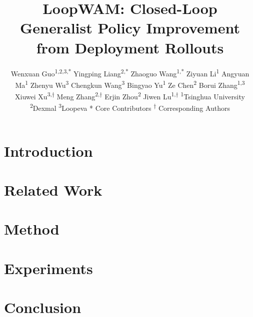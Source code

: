 \documentclass[10pt,logo]{loopwamreport}
\title{LoopWAM: Closed-Loop Generalist Policy Improvement from Deployment Rollouts}
\author{%
  Wenxuan Guo\textsuperscript{1,2,3,*}\quad\quad
  Yingping Liang\textsuperscript{2,*}\quad\quad
  Zhaoguo Wang\textsuperscript{1,*}\quad\quad
  Ziyuan Li\textsuperscript{1}\quad\quad
  Angyuan Ma\textsuperscript{1}\newline
  Zhenyu Wu\textsuperscript{3}\quad\quad
  Chengkun Wang\textsuperscript{3}\quad\quad
  Bingyao Yu\textsuperscript{1}\quad\quad
  Ze Chen\textsuperscript{2}\quad\quad
  Borui Zhang\textsuperscript{1,3}\newline
  Xiuwei Xu\textsuperscript{3,$\dagger$}\quad\quad
  Meng Zhang\textsuperscript{2,$\dagger$}\quad\quad
  Erjin Zhou\textsuperscript{2}\quad\quad
  Jiwen Lu\textsuperscript{1,$\dagger$}\newline
  {\normalfont\fontsize{10}{14}\selectfont
   \textsuperscript{1}Tsinghua University\quad\quad
   \textsuperscript{2}Dexmal\quad\quad
   \textsuperscript{3}Loopeva}\newline
  {\normalfont\fontsize{8}{11}\selectfont
   * Core Contributors\qquad
   \textsuperscript{$\dagger$} Corresponding Authors}%
}
\begin{document}
\maketitle
\raggedbottom
{}
\setlength{\emergencystretch}{3em}

\begin{abstract}

\end{abstract}
\abscontent

\section{Introduction}
\label{sec:introduction}


\section{Related Work}
\label{sec:related_work}

\section{Method}
\label{sec:method}

\section{Experiments}
\label{sec:experiments}

\section{Conclusion}
\label{sec:conclusion}







\clearpage
\appendix

\end{document}
